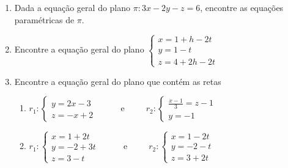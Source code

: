 \documentclass{article}
\begin{document}
\begin{enumerate}
\begin{enumerate}
	\item O ponto de $\pi$ que tem coordenadas $x=1$ e $y=3$;
	\item O ponto de $\pi$ que tem coordenadas $x=0$ e $z=2$;
	\item O valor de $k$ para que o ponto $P = (k, 2, k-1)$ perten\c{c}a a $\pi$;
	\item O ponto de coordenada $x=2$ cuja coordenada $y$ \'e o dobro da coordenada $z$;
	\item O valor de $k$ para que o plano $\pi_1:kx-4y+4z = 7$ seja paralelo a $\pi$.
\end{enumerate}

\item Dada a equa\c{c}\~ao geral do plano $\pi: 3x - 2y - z = 6$, encontre as equa\c{c}\~oes param\'etricas de $\pi$.

\item Encontre a equa\c{c}\~ao geral do plano 
$\left\{\begin{array}{l}
	x = 1 + h - 2t \\
	y = 1 - t \\
	z = 4 + 2h - 2t
\end{array}\right.$

\item Encontre a equa\c{c}\~ao geral do plano que cont\'em as retas

\begin{enumerate}
	\item
		$r_1:\left\{\begin{array}{l}
			y = 2x - 3 \\
			z = -x + 2
		\end{array}\right.$
	\ \ \ \ \ e\ \ \ \ \ 
		$r_2:\left\{\begin{array}{l}
			\frac{x-1}{3} = z-1 \\
			y = -1
		\end{array}\right.$
	\item
		$r_1:\left\{\begin{array}{l}
			x = 1 + 2t \\
			y = -2 + 3t \\
			z = 3 -t
		\end{array}\right.$
	\ \ \ \ \ e\ \ \ \ \ 
		$r_2:\left\{\begin{array}{l}
			x = 1 - 2t \\
			y = -2 - t \\
			z = 3 + 2t
		\end{array}\right.$
\end{enumerate}


\end{enumerate}
\end{document}

